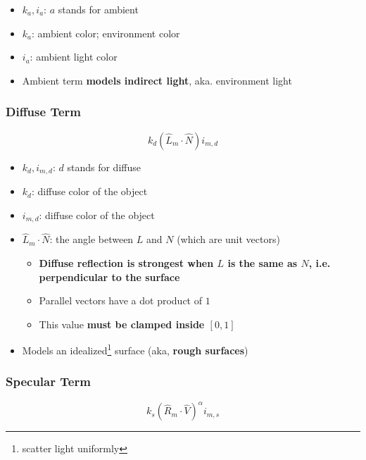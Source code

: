     \begin{itemize}
      \item $ k_{a}, i_{a} $: $ a $ stands for ambient
      \item $ k_{a} $: ambient color; environment color
      \item $ i_{a} $: ambient light color
      \item Ambient term \textbf{models indirect light}, aka. environment light
    \end{itemize}

  \subsubsection{Diffuse Term}

    \begin{equation}
      k_{d} \left( \hat{L}_{m} \cdot \hat{N} \right) i_{m, d}
    \end{equation}

    \begin{itemize}
      \item $ k_{d}, i_{m, d} $: $ d $ stands for diffuse
      \item $ k_{d} $: diffuse color of the object
      \item $ i_{m, d} $: diffuse color of the object
      \item $ \hat{L}_{m} \cdot \hat{N} $: the angle between $ L $ and $ N $
      (which are unit vectors)
      \begin{itemize}
        \item \textbf{Diffuse reflection is strongest when $ L $ is
        the same as $ N $, i.e. perpendicular to the surface}
        \item Parallel vectors have a dot product of $ 1 $
        \item This value \textbf{must be clamped inside $ \left[0, 1 \right]$}
      \end{itemize}

      \item Models an idealized\footnote{scatter light uniformly} surface
      (aka, \textbf{rough surfaces})
    \end{itemize}

  \subsubsection{Specular Term}

    \begin{equation}
      k_{s} \left( \hat{R}_{m} \cdot \hat{V} \right)^{\alpha} i_{m, s}
    \end{equation}


